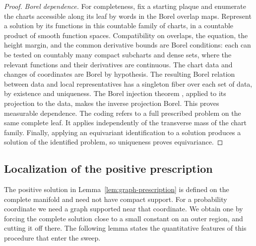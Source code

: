 \begin{proof}
\emph{Borel dependence.}
For completeness, fix a starting plaque and enumerate the charts
accessible along its leaf by words in the Borel overlap maps.
Represent a solution by its functions in this countable family
of charts, in a countable product of smooth function spaces.
Compatibility on overlaps, the equation, the height margin, and
the common derivative bounds are Borel conditions: each can be
tested on countably many compact subcharts and dense sets, where
the relevant functions and their derivatives are continuous.
The chart data and changes of coordinates are Borel by
hypothesis.  The resulting Borel relation between data and local
representatives has a singleton fiber over each set of data,
by existence and uniqueness.  The Borel injection theorem
\cite[Corollary~15.2]{Kechris1995},
applied to its projection to the data, makes the inverse
projection Borel.  This proves measurable dependence.  The
coding refers to a full prescribed problem on the same complete
leaf.  It applies independently of the transverse mass of the
chart family.  Finally, applying an equivariant identification
to a solution produces a solution of the identified problem, so
uniqueness proves equivariance.
\end{proof}

\subsection{Localization of the positive prescription}

The positive solution in Lemma~\ref{lem:graph-prescription} is
defined on the complete manifold and need not have compact support.
For a probability coordinate we need a graph supported near that
coordinate.  We obtain one by forcing the complete solution close
to a small constant on an outer region, and cutting it off there.
The following lemma states the quantitative features of this
procedure that enter the sweep.

